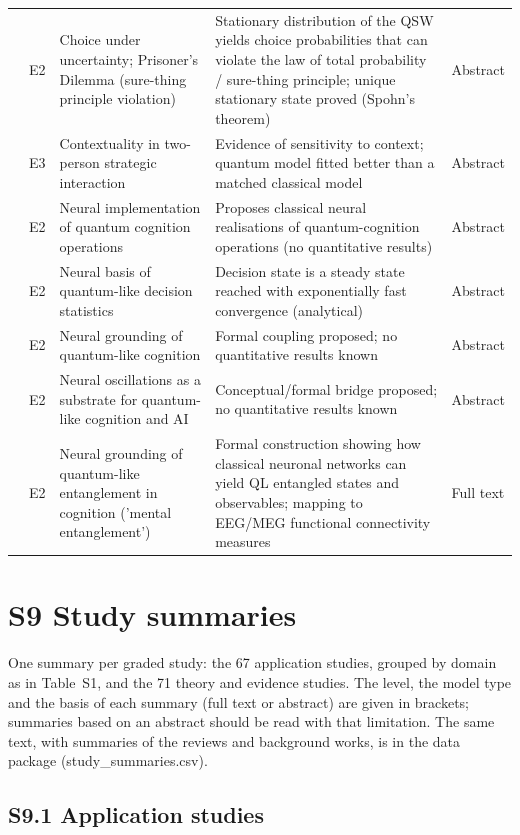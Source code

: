 \documentclass[10pt,a4paper]{article}
\begin{document}
\begin{longtable}{@{}P{3.6cm}P{0.7cm}P{4.6cm}P{6.2cm}P{1.1cm}@{}}
\citet{MartinezMartinez2016} & E2 & Choice under uncertainty; Prisoner's Dilemma (sure-thing principle violation) & Stationary distribution of the QSW yields choice probabilities that can violate the law of total probability / sure-thing principle; unique stationary state proved (Spohn's theorem) & Abstract \\
\citet{Waddup2021} & E3 & Contextuality in two-person strategic interaction & Evidence of sensitivity to context; quantum model fitted better than a matched classical model & Abstract \\
\citet{Busemeyer2017a} & E2 & Neural implementation of quantum cognition operations & Proposes classical neural realisations of quantum-cognition operations (no quantitative results) & Abstract \\
\citet{Khrennikov2018} & E2 & Neural basis of quantum-like decision statistics & Decision state is a steady state reached with exponentially fast convergence (analytical) & Abstract \\
\citet{Khrennikov2025a} & E2 & Neural grounding of quantum-like cognition & Formal coupling proposed; no quantitative results known & Abstract \\
\citet{Khrennikov2025b} & E2 & Neural oscillations as a substrate for quantum-like cognition and AI & Conceptual/formal bridge proposed; no quantitative results known & Abstract \\
\citet{Khrennikov2025c} & E2 & Neural grounding of quantum-like entanglement in cognition ('mental entanglement') & Formal construction showing how classical neuronal networks can yield QL entangled states and observables; mapping to EEG/MEG functional connectivity measures & Full text \\
\end{longtable}
\normalsize
\section*{S9 Study summaries}
\noindent One summary per graded study: the 67 application studies, grouped by domain as in Table~S1, and the 71 theory and evidence studies. The level, the model type and the basis of each summary (full text or abstract) are given in brackets; summaries based on an abstract should be read with that limitation. The same text, with summaries of the reviews and background works, is in the data package (study\_summaries.csv).
\subsection*{S9.1 Application studies}
\end{document}
